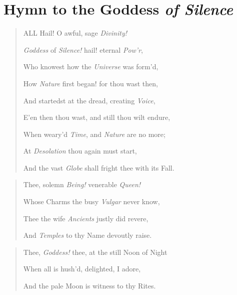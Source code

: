 \documentclass[a4paper, 11pt, oneside]{article}
\begin{document}
\section*{Hymn to the Goddess \emph{of Silence}}

\bigskip

\begin{quotation}
\hspace*{10mm}ALL Hail! O awful, sage \emph{Divinity!}

\emph{Goddess} of \emph{Silence!} hail! eternal \emph{Pow'r},

Who knowest how the \emph{Universe} was form'd,

How \emph{Nature} first began! for thou wast then,

And startedst at the dread, creating \emph{Voice},

E'en then thou wast, and still thou wilt endure,

When weary'd \emph{Time}, and \emph{Nature} are no more;

At \emph{Desolation} thou again must start,

And the vast \emph{Globe} shall fright thee with its Fall.
\end{quotation}
\begin{quotation}
\hspace*{10mm}Thee, solemn \emph{Being!} venerable \emph{Queen!}

Whose Charms the busy \emph{Vulgar} never know,

Thee the wife \emph{Ancients} justly did revere,

And \emph{Temples} to thy Name devoutly raise.
\end{quotation}
\begin{quotation}
\hspace*{10mm}Thee, \emph{Goddess!} thee, at the still Noon of Night

When all is hush'd, delighted, I adore,

And the pale Moon is witness to thy Rites.
\end{quotation}
\end{document}
